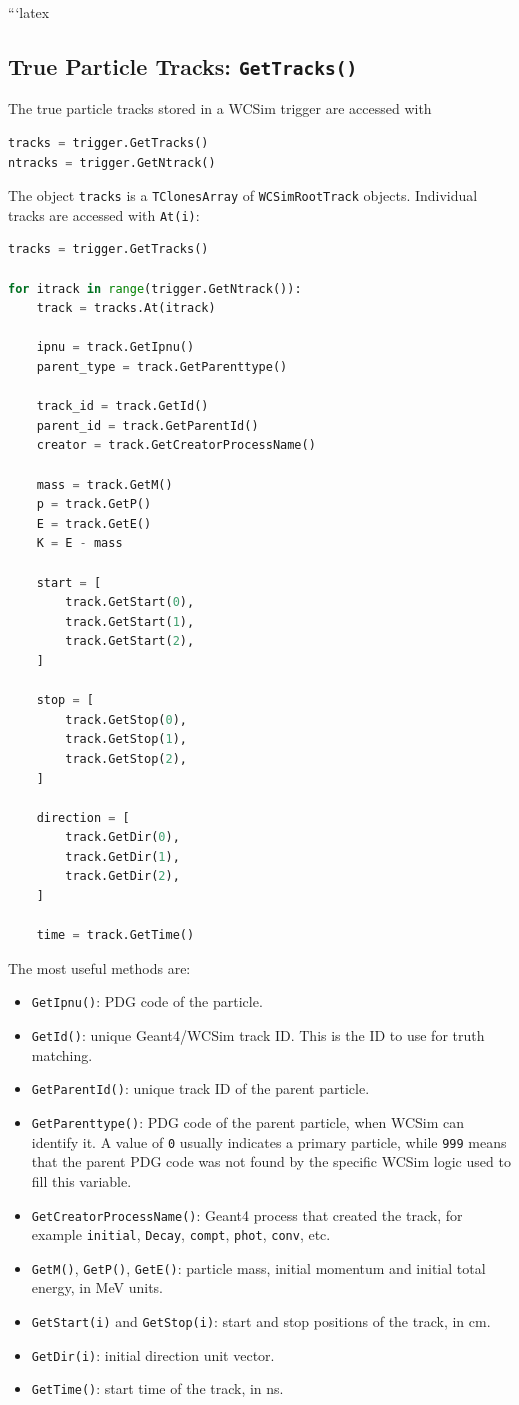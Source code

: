 \documentclass{article}
\numberwithin{table}{subsection}
\numberwithin{figure}{subsection}
\numberwithin{equation}{subsection}
\numberwithin{footnote}{subsection}
\begin{document}
```latex
\subsection{True Particle Tracks: \texttt{GetTracks()}}

The true particle tracks stored in a WCSim trigger are accessed with
\begin{lstlisting}[language=python]
tracks = trigger.GetTracks()
ntracks = trigger.GetNtrack()
\end{lstlisting}
The object \texttt{tracks} is a \texttt{TClonesArray} of
\texttt{WCSimRootTrack} objects. Individual tracks are accessed with
\texttt{At(i)}:
\begin{lstlisting}[language=python]
tracks = trigger.GetTracks()

for itrack in range(trigger.GetNtrack()):
    track = tracks.At(itrack)

    ipnu = track.GetIpnu()
    parent_type = track.GetParenttype()

    track_id = track.GetId()
    parent_id = track.GetParentId()
    creator = track.GetCreatorProcessName()

    mass = track.GetM()
    p = track.GetP()
    E = track.GetE()
    K = E - mass

    start = [
        track.GetStart(0),
        track.GetStart(1),
        track.GetStart(2),
    ]

    stop = [
        track.GetStop(0),
        track.GetStop(1),
        track.GetStop(2),
    ]

    direction = [
        track.GetDir(0),
        track.GetDir(1),
        track.GetDir(2),
    ]

    time = track.GetTime()
\end{lstlisting}
The most useful methods are:
\begin{itemize}
    \item \texttt{GetIpnu()}: PDG code of the particle.
    \item \texttt{GetId()}: unique Geant4/WCSim track ID. This is the ID to use
    for truth matching.
    \item \texttt{GetParentId()}: unique track ID of the parent particle.
    \item \texttt{GetParenttype()}: PDG code of the parent particle, when WCSim
    can identify it. A value of \texttt{0} usually indicates a primary particle,
    while \texttt{999} means that the parent PDG code was not found by the
    specific WCSim logic used to fill this variable.
    \item \texttt{GetCreatorProcessName()}: Geant4 process that created the
    track, for example \texttt{initial}, \texttt{Decay}, \texttt{compt},
    \texttt{phot}, \texttt{conv}, etc.
    \item \texttt{GetM()}, \texttt{GetP()}, \texttt{GetE()}: particle mass,
    initial momentum and initial total energy, in MeV units.
    \item \texttt{GetStart(i)} and \texttt{GetStop(i)}: start and stop positions
    of the track, in cm.
    \item \texttt{GetDir(i)}: initial direction unit vector.
    \item \texttt{GetTime()}: start time of the track, in ns.
\end{itemize}
\end{document}
